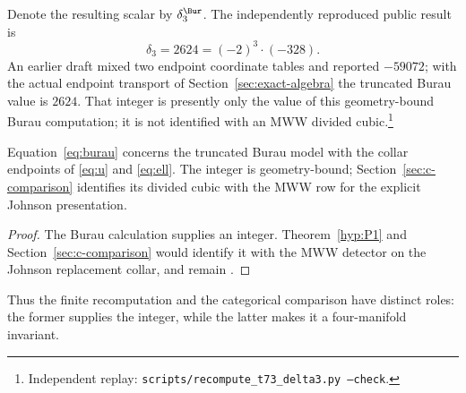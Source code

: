 Denote the resulting scalar by $\delta_3^{\Bur}$.  The independently
reproduced public result is
\begin{equation}\label{eq:burau}
\delta_3=2624=(-2)^3\cdot(-328).
\end{equation}
An earlier draft mixed two endpoint coordinate tables and reported
$-59072$; with the actual endpoint transport of Section~\ref{sec:exact-algebra}
the truncated Burau value is $2624$.  That integer is presently only the
value of this geometry-bound Burau computation; it is not identified with an MWW
divided cubic.\footnote{Independent replay:
\texttt{scripts/recompute\_t73\_delta3.py --check}.}

\begin{proposition}\label{prop:scope}
Equation~\eqref{eq:burau} concerns the truncated Burau model with the collar
endpoints of \eqref{eq:u} and \eqref{eq:ell}.  The integer is geometry-bound;
Section~\ref{sec:c-comparison} identifies its divided cubic with the MWW row
for the explicit Johnson presentation.
\end{proposition}

\begin{proof}
The Burau calculation supplies an integer.  Theorem~\ref{hyp:P1} and
Section~\ref{sec:c-comparison} would identify it with the MWW detector on the
Johnson replacement collar, and remain \Open.
\end{proof}

Thus the finite recomputation and the categorical comparison have distinct
roles: the former supplies the integer, while the latter makes it a
four-manifold invariant.


